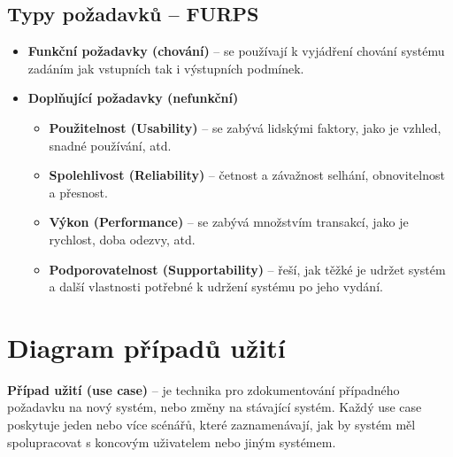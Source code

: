 \subsection{Typy požadavků -- FURPS}
\begin{itemize}
    \item \textbf{Funkční požadavky (chování)} -- se používají k vyjádření chování systému zadáním jak vstupních tak i výstupních podmínek.
    \item \textbf{Doplňující požadavky (nefunkční)}
          \begin{itemize}
              \item \textbf{Použitelnost (Usability)} -- se zabývá lidskými faktory, jako je vzhled, snadné používání, atd.
              \item \textbf{Spolehlivost (Reliability)} --  četnost a závažnost selhání, obnovitelnost a přesnost.
              \item \textbf{Výkon (Performance)} -- se zabývá množstvím transakcí, jako je rychlost, doba odezvy, atd.
              \item \textbf{Podporovatelnost (Supportability)} -- řeší, jak těžké je udržet systém a další vlastnosti potřebné k udržení systému po jeho vydání.
          \end{itemize}
\end{itemize}

\section{Diagram případů užití}
\textbf{Případ užití (use case)} -- je technika pro zdokumentování případného požadavku na nový systém, nebo změny na stávající systém. Každý use case poskytuje jeden nebo více scénářů, které zaznamenávají, jak by systém měl spolupracovat s koncovým uživatelem nebo jiným systémem.

